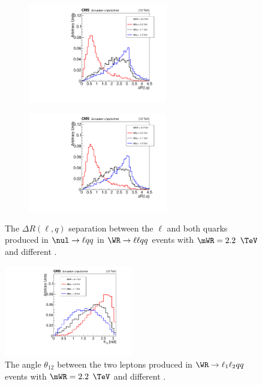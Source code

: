 \begin{figure}
	\centering
	\begin{subfigure}[t]{2.4in}
		\centering
		\includegraphics[width=2.4in]{figures/dRgenLeptonFromScdHvyPtclGenQuarkOneFromScdHvyPtcl_MWR_2200_several_MNu_private.pdf}
	\end{subfigure}
	\thickspace
	\begin{subfigure}[t]{2.4in}
		\centering
		\includegraphics[width=2.4in]{figures/dRgenLeptonFromScdHvyPtclGenQuarkTwoFromScdHvyPtcl_MWR_2200_several_MNu_private.pdf}
	\end{subfigure}
	\caption{The $\Delta R(\ell,q)$ separation between the $\ell$ and both quarks produced in $\nul \rightarrow \ell qq$ 
		in $\WR \rightarrow \ell\ell qq$ events with $\mWR = 2.2$ $\TeV$ and different \mnul.}\label{fig:wrDrLeptQrkVarMNu}
\end{figure}

\begin{figure}[h]
	\centering
	\includegraphics[width=0.5\textwidth]{figures/angleBtwnGenLepts_MWR_2200_several_MNu_private.pdf}
	\caption{The angle $\theta_{12}$ between the two leptons produced in $\WR \rightarrow \ell_{1}\ell_{2} qq$ events with 
		$\mWR = 2.2$ $\TeV$ and different \mnul.}
	\label{fig:wrLeptAngleSepVarMNu}
\end{figure}

